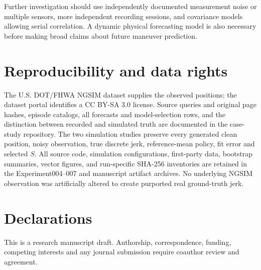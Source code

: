 Further investigation should
use independently documented
measurement noise or multiple
sensors, more independent
recording sessions, and
covariance models allowing
serial correlation. A
dynamic physical forecasting
model is also necessary
before making broad claims
about future maneuver prediction.

\section*{Reproducibility and data rights}
The U.S. DOT/FHWA NGSIM dataset
\citep{fhwa2016} supplies
the observed positions; the
dataset portal identifies
a CC BY-SA 3.0 license.
Source queries and original
page hashes, episode catalogs,
all forecasts and model-selection
rows, and the distinction
between recorded and simulated
truth are documented in
the case-study repository.
The two simulation studies
preserve every generated
clean position, noisy
observation, true discrete
jerk, reference-mean policy,
fit error and selected $S$.
All source code, simulation
configurations, first-party
data, bootstrap summaries,
vector figures, and
run-specific SHA-256
inventories are retained
in the Experiment004--007
and manuscript artifact
archives. No underlying
NGSIM observation was
artificially altered to
create purported real
ground-truth jerk.

\section*{Declarations}
This is a research manuscript
draft. Authorship, correspondence,
funding, competing interests
and any journal submission
require coauthor review
and agreement.
